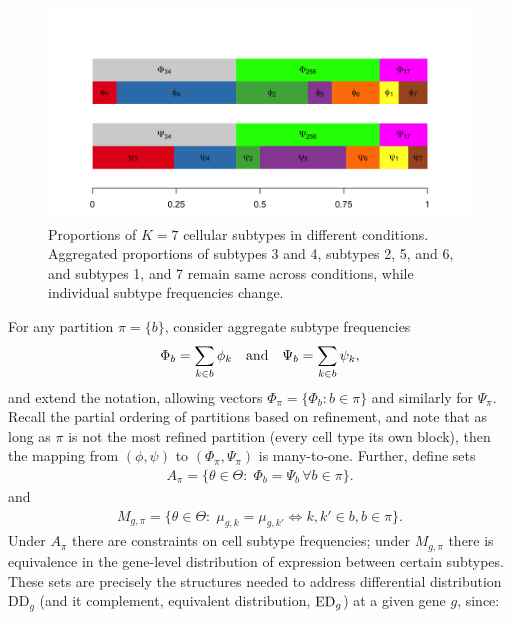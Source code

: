 \documentclass[11pt]{amsart}
\begin{document}
\begin{figure}[h!]
  \includegraphics[width=\linewidth]{Figs/schematic-1.png}
  \caption{Proportions of $K=7$ cellular subtypes in different conditions. 
 Aggregated proportions of subtypes 3 and 4, subtypes 2, 5, and 6, and subtypes 1, and 7 
 remain same across conditions, while individual subtype frequencies change.  }
  \label{fig:1}
\end{figure}



For any partition $\pi=\{b\}$, consider aggregate subtype frequencies
\begin{eqnarray*}
\Phi_b = \sum_{k\in b} \phi_k \quad {\mbox {\rm  and}} \quad 
 \Psi_b = \sum_{k\in b} \psi_k,
\end{eqnarray*}
and extend the notation, allowing vectors $\Phi_\pi = \{ \Phi_b: b \in \pi \}$ and similarly
for $\Psi_\pi$. Recall the partial ordering of partitions based on refinement, and note that
as long as $\pi$ is not the most refined partition (every cell type its own block),
then the mapping from $( \phi, \psi )$ to $( \Phi_\pi, \Psi_\pi)$ is many-to-one.
Further, define sets
\begin{eqnarray}
\label{eq:asets}
A_\pi = \{ \theta\in \Theta: \; \Phi_b = \Psi_b  \, \forall b \in \pi \}.
\end{eqnarray}
and
\begin{eqnarray}
\label{eq:msets}
M_{g,\pi} = \{ \theta \in \Theta: \; \mu_{g,k} = \mu_{g,k'} \iff k,k' \in b, b \in \pi \}.
\end{eqnarray}
Under $A_\pi$ there are constraints on cell subtype frequencies; under $M_{g,\pi}$ there is 
equivalence in the gene-level distribution of expression between certain subtypes.
These sets are precisely the
structures needed to address differential distribution DD$_g$ (and
it complement, equivalent distribution, ${\rm ED}_g$) at a given gene
$g$, since:
\end{document}
